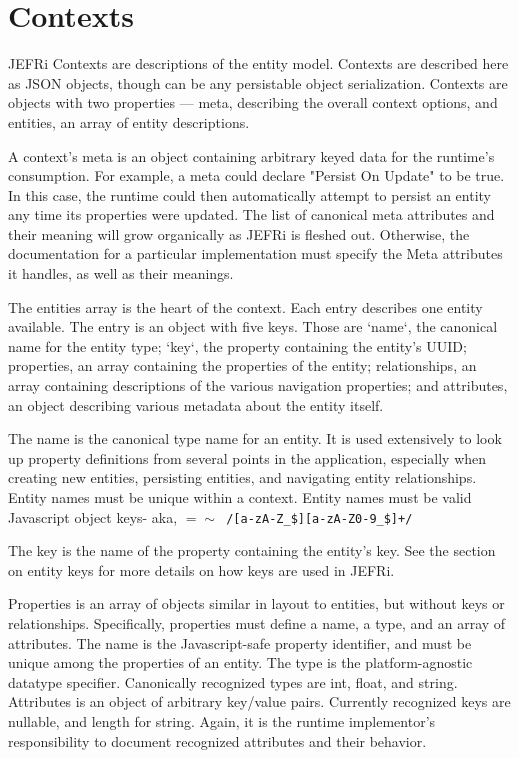 \documentclass{article}
\begin{document}
\section{Contexts}
JEFRi Contexts are descriptions of the entity model. Contexts are described here
as JSON objects, though can be any persistable object serialization. Contexts
are objects with two properties --- meta, describing the overall context options,
and entities, an array of entity descriptions.

A context's meta is an object containing arbitrary keyed data for the runtime's
consumption. For example, a meta could declare "Persist On Update" to be true.
In this case, the runtime could then automatically attempt to persist an entity
any time its properties were updated. The list of canonical meta attributes and
their meaning will grow organically as JEFRi is fleshed out. Otherwise, the
documentation for a particular implementation must specify the Meta attributes
it handles, as well as their meanings.

The entities array is the heart of the context. Each entry describes one entity
available. The entry is an object with five keys. Those are `name`, the canonical
name for the entity type; `key`, the property containing the entity's UUID;
properties, an array containing the properties of the entity; relationships, an
array containing descriptions of the various navigation properties; and
attributes, an object describing various metadata about the entity itself.

The name is the canonical type name for an entity. It is used extensively to
look up property definitions from several points in the application, especially
when creating new entities, persisting entities, and navigating entity
relationships. Entity names must be unique within a context. Entity names must
be valid Javascript object keys- aka,
{\tt $=\sim$ /[a-zA-Z\_\$][a-zA-Z0-9\_\$]+/}

The key is the name of the property containing the entity's key. See the
section on entity keys for more details on how keys are used in JEFRi.

Properties is an array of objects similar in layout to entities, but without keys
or relationships. Specifically, properties must define a name, a type, and an
array of attributes. The name is the Javascript-safe property identifier, and
must be unique among the properties of an entity. The type is the
platform-agnostic datatype specifier. Canonically recognized types are int,
float, and string. Attributes is an object of arbitrary key/value pairs.
Currently recognized keys are nullable, and length for string. Again, it is the
runtime implementor's responsibility to document recognized attributes and their
behavior.
\end{document}
